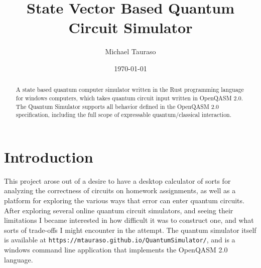 \documentclass[%
 reprint,
 amsmath,amssymb,
 aps,
]{revtex4-2}
\begin{document}

\title{State Vector Based Quantum Circuit Simulator}
\author{Michael Tauraso}
%


%

\date{\today}%

\begin{abstract}
A state based quantum computer simulator written in the Rust programming language for windows computers, which takes quantum circuit input written in OpenQASM 2.0. The Quantum Simulator supports all behavior defined in the OpenQASM 2.0 specification, including the full scope of expressable quantum/classical interaction.\end{abstract}

\maketitle




\section{\label{sec:level1}Introduction}
This project arose out of a desire to have a desktop calculator of sorts for analyzing the correctness of circuits on homework assignments, as well as a platform for exploring the various ways that error can enter quantum circuits. After exploring several online quantum circuit simulators, and seeing their limitations I became interested in how difficult it was to construct one, and what sorts of trade-offs I might encounter in the attempt. The quantum simulator itself is available at \texttt{https://mtauraso.github.io/QuantumSimulator/}, and is a windows command line application that implements the OpenQASM 2.0 language.
\end{document}
